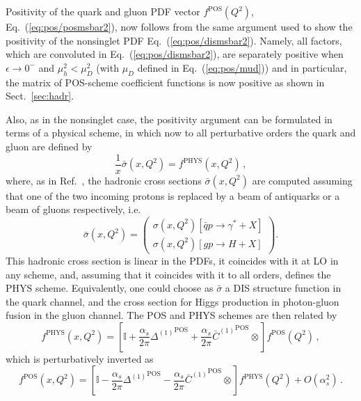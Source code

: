 Positivity of the quark and gluon PDF vector $ f^{{\textrm{POS}}}(Q^2)$,
Eq.~(\ref{eq:pos/posmsbar2}), now follows from the same argument used to
show the positivity of the nonsinglet PDF 
Eq.~(\ref{eq:pos/dismsbar2}). Namely, all
factors, which are convoluted in Eq.~(\ref{eq:pos/dismsbar2}), are 
separately positive when $\epsilon \to 0^-$ and  $\mu_h^2 < \mu_D^2$ (with
$\mu_D$ defined in Eq.~(\ref{eq:pos/mud})) and in particular, the matrix of POS-scheme coefficient
functions is now positive as shown in Sect.~\ref{sec:hadr}.

Also, as in the nonsinglet case,  the positivity argument can be formulated in terms of
a physical scheme, in which now 
to all perturbative orders the quark and gluon are defined by
\begin{equation}\label{eq:pos/phys}
 \frac{1}{x} \bar\sigma(x,Q^2)=f^{\textrm{PHYS}}(x,Q^2) \,,
\end{equation}
where, as in Ref.~\cite{Altarelli:1998gn}, the hadronic cross sections $\bar\sigma(x,Q^2)$ are computed
assuming that one of the two incoming protons is replaced 
by a beam of antiquarks or a beam of gluons respectively, i.e.\ 
\begin{equation}\label{eq:pos/physxsec}
   \bar\sigma(x,Q^2)=\left(\begin{array}{c} \sigma(x,Q^2)[\bar q
       p\to \gamma^*+X]\\ \sigma(x,Q^2)[gp \to H+X]\end{array}\right).
\end{equation}
This hadronic cross section is linear in the PDFs, it coincides with it
at LO in any scheme, and, assuming that it coincides with it to all
orders, defines the PHYS scheme. Equivalently, one could choose as
$\bar \sigma$ a DIS structure function in the quark channel, and the
cross section for Higgs production in photon-gluon fusion in the gluon
channel.
The POS and PHYS schemes are then related by
\begin{equation}\label{eq:pos/postodis}
f^{\textrm{PHYS}}(x,Q^2)=
\left[\mathbb{I}+\frac{\alpha_s}{2\pi} {\Delta^{(1)}}^{\textrm{POS}}
  +\frac{\alpha_s}{2\pi}  {\bar
    C^{(1)}{}}^{\textrm{POS}}\otimes\right]f^{\textrm{POS}}(Q^2) \,,
\end{equation}
which is perturbatively inverted as  
\begin{equation}\label{eq:pos/distopos}
f^{\textrm{POS}}(x,Q^2)=
\left[\mathbb{I}-\frac{\alpha_s}{2\pi} {\Delta^{(1)}}^{\textrm{POS}}
  -\frac{\alpha_s}{2\pi}  {\bar
    C^{(1)}{}}^{\textrm{POS}}\otimes\right]f^{\textrm{PHYS}}(Q^2)+O(\alpha_s^2)\,.
\end{equation}

